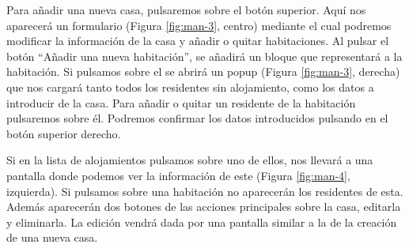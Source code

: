 Para añadir una nueva casa, pulsaremos sobre el botón superior. Aquí nos aparecerá un formulario (Figura \ref{fig:man-3}, centro) mediante el cual podremos modificar la información de la casa y añadir o quitar habitaciones. Al pulsar el botón ``Añadir una nueva habitación'', se añadirá un bloque que representará a la habitación. Si pulsamos sobre el se abrirá un popup (Figura \ref{fig:man-3}, derecha) que nos cargará tanto todos los residentes sin alojamiento, como los datos a introducir de la casa. Para añadir o quitar un residente de la habitación pulsaremos sobre él. Podremos confirmar los datos introducidos pulsando en el botón superior derecho.

Si en la lista de alojamientos pulsamos sobre uno de ellos, nos llevará a una pantalla donde podemos ver la información de este (Figura \ref{fig:man-4}, izquierda). Si pulsamos sobre una habitación no aparecerán los residentes de esta. Además aparecerán dos botones de las acciones principales sobre la casa, editarla y eliminarla. La edición vendrá dada por una pantalla similar a la de la creación de una nueva casa. 

